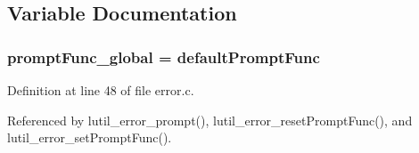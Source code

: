 \subsection{Variable Documentation}
\subsubsection{ {\bf prompt\-Func\_\-global} = default\-Prompt\-Func\hspace{0.3cm}{\tt  [static]}}\label{error_8c_a1}




Definition at line 48 of file error.c.

Referenced by lutil\_\-error\_\-prompt(), lutil\_\-error\_\-reset\-Prompt\-Func(), and lutil\_\-error\_\-set\-Prompt\-Func().